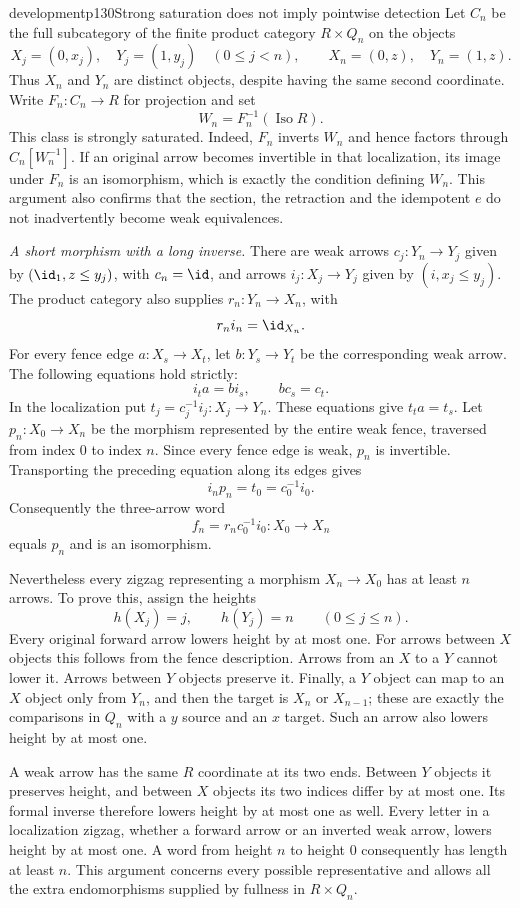 \begin{dcomment}{development}{p130}{Strong saturation does not imply pointwise detection}
Let $C_n$ be the full subcategory of the finite product category $R\times Q_n$ on the objects
\[
 X_j=(0,x_j),\quad Y_j=(1,y_j)\quad(0\leq j<n),\qquad
 X_n=(0,z),\quad Y_n=(1,z).
\]
Thus $X_n$ and $Y_n$ are distinct objects, despite having the same second coordinate. Write $F_n:C_n\to R$ for projection and set
\[
 W_n=F_n^{-1}(\operatorname{Iso}R).
\]
This class is strongly saturated. Indeed, $F_n$ inverts $W_n$ and hence factors through $C_n[W_n^{-1}]$. If an original arrow becomes invertible in that localization, its image under $F_n$ is an isomorphism, which is exactly the condition defining $W_n$. This argument also confirms that the section, the retraction and the idempotent $e$ do not inadvertently become weak equivalences.

\textit{A short morphism with a long inverse.}
There are weak arrows $c_j:Y_n\to Y_j$ given by $(\id_1,z\leq y_j)$, with $c_n=\id$, and arrows $i_j:X_j\to Y_j$ given by $(i,x_j\leq y_j)$. The product category also supplies $r_n:Y_n\to X_n$, with
\[
 r_ni_n=\id_{X_n}.
\]
For every fence edge $a:X_s\to X_t$, let $b:Y_s\to Y_t$ be the corresponding weak arrow. The following equations hold strictly:
\[
 i_ta=bi_s,\qquad bc_s=c_t.
\]
In the localization put $t_j=c_j^{-1}i_j:X_j\to Y_n$. These equations give $t_ta=t_s$. Let $p_n:X_0\to X_n$ be the morphism represented by the entire weak fence, traversed from index $0$ to index $n$. Since every fence edge is weak, $p_n$ is invertible. Transporting the preceding equation along its edges gives
\[
 i_np_n=t_0=c_0^{-1}i_0.
\]
Consequently the three-arrow word
\[
 f_n=r_nc_0^{-1}i_0:X_0\longrightarrow X_n
\]
equals $p_n$ and is an isomorphism.

Nevertheless every zigzag representing a morphism $X_n\to X_0$ has at least $n$ arrows. To prove this, assign the heights
\[
 h(X_j)=j,\qquad h(Y_j)=n\qquad(0\leq j\leq n).
\]
Every original forward arrow lowers height by at most one. For arrows between $X$ objects this follows from the fence description. Arrows from an $X$ to a $Y$ cannot lower it. Arrows between $Y$ objects preserve it. Finally, a $Y$ object can map to an $X$ object only from $Y_n$, and then the target is $X_n$ or $X_{n-1}$; these are exactly the comparisons in $Q_n$ with a $y$ source and an $x$ target. Such an arrow also lowers height by at most one.

A weak arrow has the same $R$ coordinate at its two ends. Between $Y$ objects it preserves height, and between $X$ objects its two indices differ by at most one. Its formal inverse therefore lowers height by at most one as well. Every letter in a localization zigzag, whether a forward arrow or an inverted weak arrow, lowers height by at most one. A word from height $n$ to height $0$ consequently has length at least $n$. This argument concerns every possible representative and allows all the extra endomorphisms supplied by fullness in $R\times Q_n$.


\end{dcomment}

